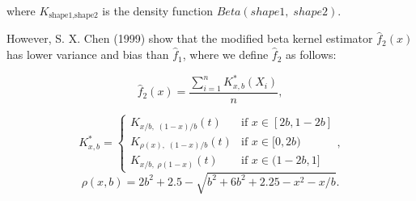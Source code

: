 \documentclass[12pt,twoside]{smiththesis}
\begin{document}
where \(K_{\text{shape1}, \text{shape2}}\) is the density function \(Beta(shape1, \; shape2)\).

However, S. X. Chen (1999) show that the modified beta kernel estimator \(\hat f_2(x)\) has lower variance and bias than \(\hat f_1\), where we define \(\hat f_2\) as follows:

\[
\hat f_2(x)  = \dfrac{\sum_{i=1}^n K_{x,b}^*(X_i)}{n},\]

\[K^*_{x,b} = \begin{cases}K_{x/b, \; (1-x)/b }(t)  & \text{if }x \in [2b,1-2b] \\
K_{\rho(x), \; (1-x)/b } (t)  & \text{if } x \in [0,2b) \\
K_{x/b, \; \rho(1-x)}(t) & \text{if } x\in(1-2b,1]
\end{cases},
\]
\[\rho(x,b) = 2b^2 + 2.5 - \sqrt{b^2 + 6b^2 +2.25-x^2 -x/b}.\]
\end{document}
